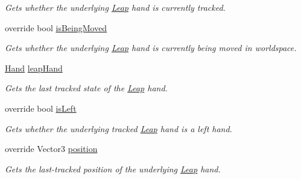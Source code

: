 \begin{DoxyCompactItemize}
\begin{DoxyCompactList}\small\item\em Gets whether the underlying \mbox{\hyperlink{namespace_leap_1_1_unity_1_1_leap}{Leap}} hand is currently tracked. \end{DoxyCompactList}\item 
override bool \mbox{\hyperlink{class_leap_1_1_unity_1_1_interaction_1_1_interaction_hand_acbb176be9d544a2f1967770f8af6f4d9}{is\+Being\+Moved}}
\begin{DoxyCompactList}\small\item\em Gets whether the underlying \mbox{\hyperlink{namespace_leap_1_1_unity_1_1_leap}{Leap}} hand is currently being moved in worldspace. \end{DoxyCompactList}\item 
\mbox{\hyperlink{class_leap_1_1_hand}{Hand}} \mbox{\hyperlink{class_leap_1_1_unity_1_1_interaction_1_1_interaction_hand_a49dba50672251b00081f95e8de3c2993}{leap\+Hand}}
\begin{DoxyCompactList}\small\item\em Gets the last tracked state of the \mbox{\hyperlink{namespace_leap_1_1_unity_1_1_leap}{Leap}} hand. \end{DoxyCompactList}\item 
override bool \mbox{\hyperlink{class_leap_1_1_unity_1_1_interaction_1_1_interaction_hand_a445aaa40de828283c32fa39440789da3}{is\+Left}}
\begin{DoxyCompactList}\small\item\em Gets whether the underlying tracked \mbox{\hyperlink{namespace_leap_1_1_unity_1_1_leap}{Leap}} hand is a left hand. \end{DoxyCompactList}\item 
override Vector3 \mbox{\hyperlink{class_leap_1_1_unity_1_1_interaction_1_1_interaction_hand_a4a543fdfc71afe7939be5be59872d3da}{position}}
\begin{DoxyCompactList}\small\item\em Gets the last-\/tracked position of the underlying \mbox{\hyperlink{namespace_leap_1_1_unity_1_1_leap}{Leap}} hand. \end{DoxyCompactList}\item 

\end{DoxyCompactItemize}
